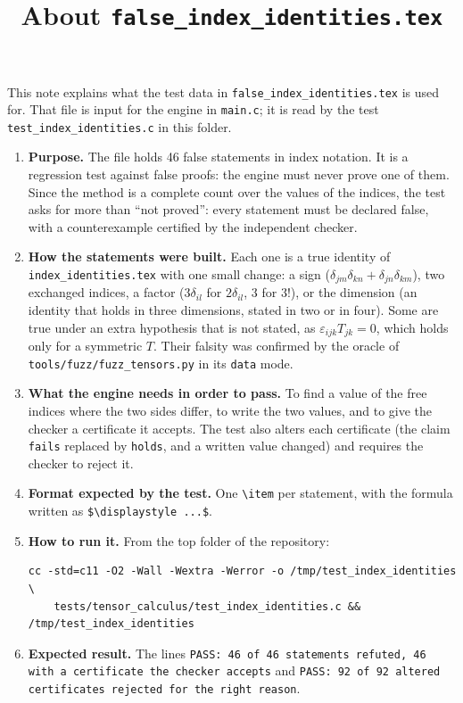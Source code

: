 \documentclass[11pt,a4paper]{article}
\title{About \texttt{false\_index\_identities.tex}}
\author{}
\date{}
\begin{document}
\maketitle
This note explains what the test data in \texttt{false\_index\_identities.tex} is used for. That file is input for the engine in \texttt{main.c}; it is read by the test \texttt{test\_index\_identities.c} in this folder.

\begin{enumerate}
\item \textbf{Purpose.} The file holds 46 false statements in index notation. It is a regression test against false proofs: the engine must never prove one of them. Since the method is a complete count over the values of the indices, the test asks for more than ``not proved'': every statement must be declared false, with a counterexample certified by the independent checker.

\item \textbf{How the statements were built.} Each one is a true identity of \texttt{index\_identities.tex} with one small change: a sign ($\delta_{jm}\delta_{kn} + \delta_{jn}\delta_{km}$), two exchanged indices, a factor ($3\delta_{il}$ for $2\delta_{il}$, $3$ for $3!$), or the dimension (an identity that holds in three dimensions, stated in two or in four). Some are true under an extra hypothesis that is not stated, as $\varepsilon_{ijk} T_{jk} = 0$, which holds only for a symmetric $T$. Their falsity was confirmed by the oracle of \texttt{tools/fuzz/fuzz\_tensors.py} in its \texttt{data} mode.

\item \textbf{What the engine needs in order to pass.} To find a value of the free indices where the two sides differ, to write the two values, and to give the checker a certificate it accepts. The test also alters each certificate (the claim \texttt{fails} replaced by \texttt{holds}, and a written value changed) and requires the checker to reject it.

\item \textbf{Format expected by the test.} One \texttt{\textbackslash item} per statement, with the formula written as \texttt{\$\textbackslash displaystyle ...\$}.

\item \textbf{How to run it.} From the top folder of the repository:
\begin{verbatim}
cc -std=c11 -O2 -Wall -Wextra -Werror -o /tmp/test_index_identities \
    tests/tensor_calculus/test_index_identities.c && /tmp/test_index_identities
\end{verbatim}

\item \textbf{Expected result.} The lines \texttt{PASS: 46 of 46 statements refuted, 46 with a certificate the checker accepts} and \texttt{PASS: 92 of 92 altered certificates rejected for the right reason}.
\end{enumerate}
\end{document}
